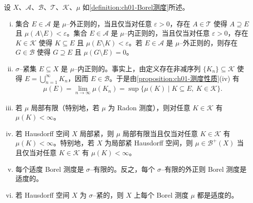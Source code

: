 \documentclass[../../main.tex]{subfiles}%
\begin{document}
\begin{remark}\label{remark:ch01-Borel测度性质}\label{remark:ch01-局部有限}
设 $X$、$\mathcal{A}$、$\mathcal{B}$、$\mathcal{T}$、$\mathcal{K}$、$\mu$ 如\cref{definition:ch01-Borel测度}所述。
\begin{enumerate}[(i)]
\item 集合 $E\in\mathcal{A}$ 是 $\mu$--外正则的，当且仅当对任意 $\varepsilon>0$，存在 $A\in\mathcal{T}$ 使得 $A\supseteq E$ 且 $\mu(A\setminus E)<\varepsilon$。集合 $E\in\mathcal{A}$ 是 $\mu$--内正则的，当且仅当对任意 $\varepsilon>0$，存在 $K\in\mathcal{K}$ 使得 $K\subseteq E$ 且 $\mu(E\setminus K)<\varepsilon$。若 $E\in\mathcal{A}$ 是 $\mu$--外正则的，则存在 $G\in\mathcal{B}$ 使得 $G\supseteq E$ 且 $\mu(G\setminus E)=0$。
\item $\sigma$--紧集 $E\subseteq X$ 是 $\mu$--内正则的。事实上，由定义存在非减序列 $\{K_n\}\subseteq\mathcal{K}$ 使得 $E=\bigcup_{n=1}^\infty K_n$，因而 $E\in\mathcal{B}$。于是由\cref{proposition:ch01-测度性质}(iv) 有
\begin{align*}
\mu(E)=\lim_{n\to\infty}\mu(K_n)=\sup\{\mu(K)\mid K\subseteq E,\ K\in\mathcal{K}\}.
\end{align*}
\item 若 $\mu$ 局部有限（特别地，若 $\mu$ 为 Radon 测度），则对任意 $K\in\mathcal{K}$ 有 $\mu(K)<\infty$。
\item 若 Hausdorff 空间 $X$ 局部紧，则 $\mu$ 局部有限当且仅当对任意 $K\in\mathcal{K}$ 有 $\mu(K)<\infty$。特别地，若 $X$ 为局部紧 Hausdorff 空间，则 $\mu\in\mathcal{B}^+(X)$ 当且仅当对任意 $K\in\mathcal{K}$ 有 $\mu(K)<\infty$。
\item 每个适度 Borel 测度是 $\sigma$--有限的。反之，每个 $\sigma$--有限的外正则 Borel 测度是适度的。
\item 若 Hausdorff 空间 $X$ 为 $\sigma$--紧的，则 $X$ 上每个 Borel 测度 $\mu$ 都是适度的。
\end{enumerate}
\end{remark}
\end{document}
